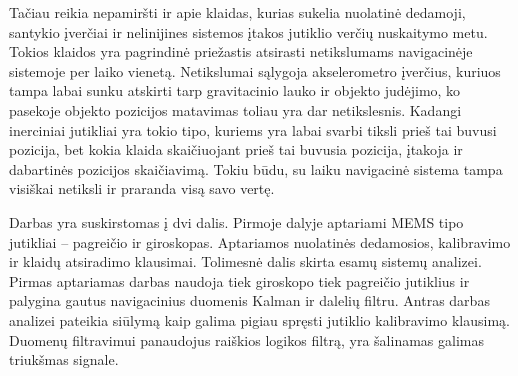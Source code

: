 Tačiau reikia nepamiršti ir apie klaidas, kurias sukelia nuolatinė dedamoji, santykio įverčiai ir nelinijines sistemos įtakos jutiklio verčių nuskaitymo metu. Tokios klaidos yra pagrindinė priežastis atsirasti netikslumams navigacinėje sistemoje per laiko vienetą. Netikslumai sąlygoja akselerometro įverčius, kuriuos tampa labai sunku atskirti tarp gravitacinio lauko ir objekto judėjimo, ko pasekoje objekto pozicijos matavimas toliau yra dar netikslesnis. Kadangi inerciniai jutikliai yra tokio tipo, kuriems yra labai svarbi tiksli prieš tai buvusi pozicija, bet kokia klaida skaičiuojant prieš tai buvusia pozicija, įtakoja ir dabartinės pozicijos skaičiavimą. Tokiu būdu, su laiku navigacinė sistema tampa visiškai netiksli ir praranda visą savo vertę.

Darbas yra suskirstomas į dvi dalis. Pirmoje dalyje aptariami MEMS tipo jutikliai -- pagreičio ir giroskopas. Aptariamos nuolatinės dedamosios, kalibravimo ir klaidų atsiradimo klausimai. Tolimesnė dalis skirta esamų sistemų analizei. Pirmas aptariamas darbas naudoja tiek giroskopo tiek pagreičio jutiklius ir palygina gautus navigacinius duomenis Kalman ir dalelių filtru. Antras darbas analizei pateikia siūlymą kaip galima pigiau spręsti jutiklio kalibravimo klausimą. Duomenų filtravimui panaudojus raiškios logikos filtrą, yra šalinamas galimas triukšmas signale.